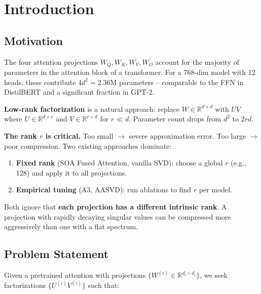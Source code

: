 \section{Introduction}

\subsection{Motivation}

The four attention projections $W_Q, W_K, W_V, W_O$ account for the majority 
of parameters in the attention block of a transformer. For a 768-dim model 
with 12 heads, these contribute $4 d^2 = 2.36$M parameters -- comparable to 
the FFN in DistilBERT and a significant fraction in GPT-2.

\textbf{Low-rank factorization} is a natural approach: replace $W \in \mathbb{R}^{d \times d}$ 
with $U V$ where $U \in \mathbb{R}^{d \times r}$ and $V \in \mathbb{R}^{r \times d}$ 
for $r \ll d$. Parameter count drops from $d^2$ to $2 r d$.

\textbf{The rank $r$ is critical.} Too small $\to$ severe approximation error. Too 
large $\to$ poor compression. Two existing approaches dominate:

\begin{enumerate}
\item \textbf{Fixed rank} (SOA Fused Attention, vanilla SVD): choose a global $r$
  (e.g., 128) and apply it to all projections.
\item \textbf{Empirical tuning} (A3, AASVD): run ablations to find $r$ per model.

\end{enumerate}
Both ignore that \textbf{each projection has a different intrinsic rank}. A 
projection with rapidly decaying singular values can be compressed more 
aggressively than one with a flat spectrum.

\subsection{Problem Statement}

Given a pretrained attention with projections $\{W^{(i)} \in \mathbb{R}^{d_i \times d_i}\}$, 
we seek factorizations $\{U^{(i)} V^{(i)}\}$ such that:

